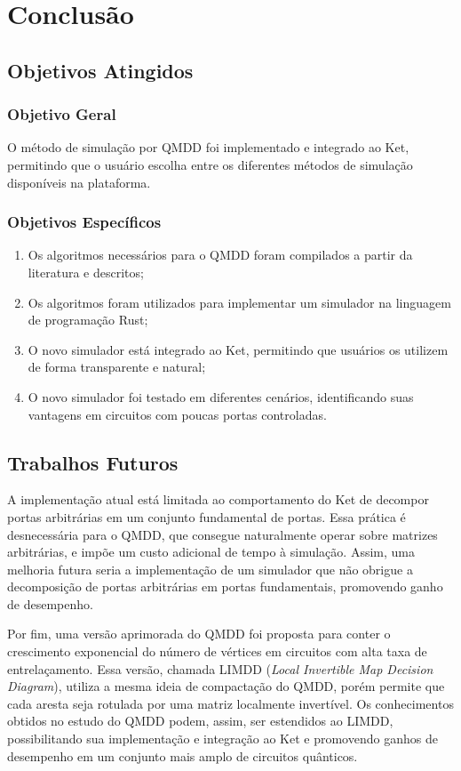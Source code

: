 \chapter{Conclusão}\label{chap:conclusion}

\section{Objetivos Atingidos}\label{sec:goals}

\subsection{Objetivo Geral}

O método de simulação por QMDD foi implementado e integrado ao Ket, permitindo que o usuário escolha entre os diferentes métodos de simulação disponíveis na plataforma.

\subsection{Objetivos Específicos}

\begin{enumerate}[label=O\arabic*]
  \item Os algoritmos necessários para o QMDD foram compilados a partir da literatura e descritos;

  \item Os algoritmos foram utilizados para implementar um simulador na linguagem de programação Rust;

  \item O novo simulador está integrado ao Ket, permitindo que usuários os utilizem de forma transparente e natural;

  \item O novo simulador foi testado em diferentes cenários, identificando suas vantagens em circuitos com poucas portas controladas.
\end{enumerate}

\section{Trabalhos Futuros}\label{sec:future}
A implementação atual está limitada ao comportamento do Ket de decompor portas arbitrárias em um conjunto fundamental de portas. Essa prática é desnecessária para o QMDD, que consegue naturalmente operar sobre matrizes arbitrárias, e impõe um custo adicional de tempo à simulação. Assim, uma melhoria futura seria a implementação de um simulador que não obrigue a decomposição de portas arbitrárias em portas fundamentais, promovendo ganho de desempenho.

Por fim, uma versão aprimorada do QMDD foi proposta para conter o crescimento exponencial do número de vértices em circuitos com alta taxa de entrelaçamento. Essa versão, chamada LIMDD ({\itshape Local Invertible Map Decision Diagram}), utiliza a mesma ideia de compactação do QMDD, porém permite que cada aresta seja rotulada por uma matriz localmente invertível. Os conhecimentos obtidos no estudo do QMDD podem, assim, ser estendidos ao LIMDD, possibilitando sua implementação e integração ao Ket e promovendo ganhos de desempenho em um conjunto mais amplo de circuitos quânticos. \cite{vinkhuijzen2023limdd}
